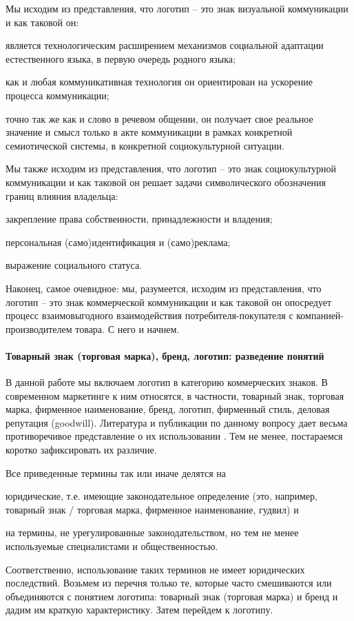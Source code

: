 Мы исходим из представления, что логотип -- это знак визуальной коммуникации и
как таковой он:
\begin{enumerate*}
\item является технологическим расширением механизмов социальной адаптации
  естественного языка, в первую очередь родного языка;
\item как и любая коммуникативная технология он ориентирован на ускорение
  процесса коммуникации;
\item точно так же как и слово в речевом общении, он получает свое реальное
  значение и смысл только в акте коммуникации в рамках конкретной
  семиотической системы, в конкретной социокультурной ситуации.
\end{enumerate*}

Мы также исходим из представления, что логотип -- это знак социокультурной
коммуникации и как таковой он решает задачи символического обозначения границ
влияния владельца:
\begin{enumerate*}[label=\asbuk*)]
\item закрепление права собственности, принадлежности и владения;
\item персональная (само)идентификация и (само)реклама;
\item выражение социального статуса.
\end{enumerate*}

Наконец, самое очевидное: мы, разумеется, исходим из представления, что логотип --
это знак коммерческой коммуникации и как таковой он опосредует процесс взаимовыгодного
взаимодействия потребителя-покупателя с компанией-производителем товара. С него и начнем.

\paragraph{Товарный знак (торговая марка), бренд, логотип: разведение понятий}


В данной работе мы включаем логотип в категорию коммерческих знаков. В современном
маркетинге к ним относятся, в частности, товарный знак, торговая марка,
фирменное наименование, бренд, логотип, фирменный стиль, деловая репутация (goodwill).
Литература и публикации по данному вопросу дает весьма противоречивое
представление о их использовании \autocites{clifton2009}{eiri2011}{designing2009}{mollerup1999marks}{serov2005}{werkman1986}. Тем не менее, постараемся коротко зафиксировать их различие.

Все приведенные термины так или иначе делятся на
\begin{enumerate*}[label=\asbuk*)]
\item юридические, т.е. имеющие законодательное определение
  (это, например, товарный знак / торговая марка, фирменное наименование, гудвил) и
\item на термины, не урегулированные законодательством, но тем не менее
  используемые специалистами и общественностью.
\end{enumerate*}
Соответственно, использование таких терминов не имеет юридических последствий.
Возьмем из перечня только те, которые часто смешиваются  или объединяются с
понятием логотипа: товарный знак (торговая марка) и бренд и дадим им краткую
характеристику. Затем перейдем к логотипу.

